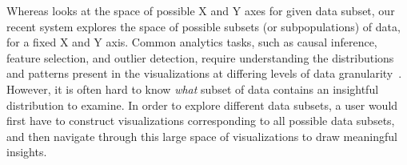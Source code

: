 \smallskip
{}
Whereas \seedb looks at the space of possible X and Y axes
for given data subset, 
our recent system \sbd explores 
the space of possible subsets 
(or subpopulations) of data,
for a fixed X and Y axis.
Common analytics tasks, 
such as causal inference, 
feature selection, and outlier detection, 
require understanding the distributions and 
patterns present in the visualizations 
at differing levels of data granularity~\cite{Anand2015,Heer2012,Wu2013}. 
However, it is often hard to know \textit{what} 
subset of data contains an 
insightful distribution to examine. 
In order to explore different data subsets, 
a user would first have to 
construct visualizations 
corresponding to all possible data subsets, 
and then navigate through this large space of 
visualizations to draw meaningful insights. 

